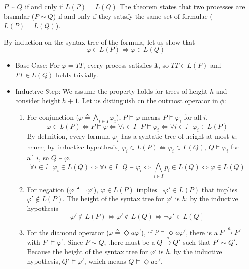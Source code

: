 \begin{Thm}{$P\sim Q$ if and only if $L(P)=L(Q)$}{}\label{thm:PsimQ-iff-lPeqlQ}
The theorem states that two processes are bisimilar ($P \sim Q$) if and only if they satisfy the same set of formulae ($L(P) = L(Q)$).

By induction on the syntax tree of the formula, let us show that
\begin{equation*}
    \varphi\in L(P) \iff \varphi\in L(Q)
\end{equation*}

\begin{demonstration}\phantom{}
\begin{itemize}
    \item Base Case: For $\varphi = TT$, every process satisfies it, so $TT \in L(P)$ and $TT \in L(Q)$ holds trivially. 
    \item Inductive Step: We assume the property holds for trees of height $h$ and consider height $h+1$. Let us distinguish on the outmost operator in $\phi$:
    \begin{enumerate}
        \item For conjunction ($\varphi\triangleq\bigwedge_{i \in I} \varphi_i$), $P \models \varphi$ means $P \models \varphi_i$ for all $i$. 
        \begin{equation*}
            \varphi\in L(P)\iff P\models\varphi \iff \forall i\in I\textit{ }P\models \varphi_i \iff \forall i\in I\textit{ }\varphi_i\in L(P)
        \end{equation*}
        By definition, every formula $\varphi_i$ has a syntatic tree of height at most $h$; hence, by inductive hypothesis, $\varphi_i\in L(P)\iff \varphi_i\in L(Q)$, $Q \models \varphi_i$ for all $i$, so $Q \models \varphi$.
        \begin{equation*}
            \forall i\in I\textit{ }\varphi_i\in L(Q)\iff \forall i\in I\textit{ }Q\models\varphi_i\iff \bigwedge_{i\in I}p_i\in L(Q)\iff \varphi\in L(Q)
        \end{equation*}
        \item For negation ($\varphi\triangleq\neg \varphi'$), $\varphi \in L(P)$ implies $\lnot\varphi'\in L(P)$ that implies $\varphi' \notin L(P)$. The height of the syntax tree for $\varphi'$ is $h$; by the inductive hypothesis
        \begin{equation*}
            \varphi' \notin L(P)\iff \varphi'\notin L(Q)\iff\neg \varphi' \in L(Q)
        \end{equation*}
        \item For the diamond operator ($\varphi\triangleq\Diamond a \varphi'$), if $P \models \Diamond a \varphi'$, there is a $P \xrightarrow{a} P'$ with $P' \models \varphi'$. Since $P \sim Q$, there must be a $Q \xrightarrow{a} Q'$ such that $P' \sim Q'$. Because the height of the syntax tree for $\varphi'$ is $h$, by the inductive hypothesis, $Q' \models \varphi'$, which means $Q \models \Diamond a \varphi'$.
    \end{enumerate}
\end{itemize}


\end{demonstration}
\end{Thm}
